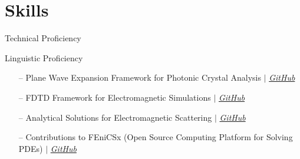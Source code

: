 \documentclass{cv}
\begin{document}
\section{Skills}
Technical Proficiency \vspace{-6pt}
\begin{itemize}
\end{itemize}
Linguistic Proficiency \vspace{-6pt}
\begin{itemize}
\end{itemize}

\begin{itemize}[leftmargin=10pt, itemsep=0pt]
    \item[--] Plane Wave Expansion Framework for Photonic Crystal Analysis
        $|$
        \emph{\href{https://github.com/tiagovla/morpho.py}{\color{blue}GitHub}}
    \item[--] FDTD Framework for Electromagnetic Simulations
        $|$
        \emph{\href{https://github.com/tiagovla/fdtd.py}{\color{blue}GitHub}}
    \item[--] Analytical Solutions for Electromagnetic Scattering
        $|$
        \emph{\href{https://github.com/tiagovla/scatsol}{\color{blue}GitHub}}
    \item[--] Contributions to FEniCSx (Open Source Computing
        Platform for Solving PDEs)
        $|$ \emph{\href{https://github.com/FEniCS}{\color{blue}GitHub}}
\end{itemize}
\end{document}
